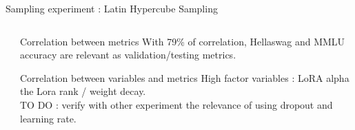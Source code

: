 \begin{frame}[allowframebreaks]{Sampling experiment : Latin Hypercube Sampling}
\begin{columns}
\begin{column}{0.3\textwidth}
        \end{column}
        \begin{column}{0.6\textwidth}
            \begin{block}{Correlation between metrics}
                With 79\% of correlation, Hellaswag and MMLU accuracy are relevant as validation/testing metrics.
            \end{block}
            \begin{block}{Correlation between variables and metrics}
                High factor variables : LoRA alpha the Lora rank / weight decay.\\
                TO DO : verify with other experiment the relevance of using dropout and learning rate.
            \end{block}
        \end{column}
    \end{columns}

\end{frame}



